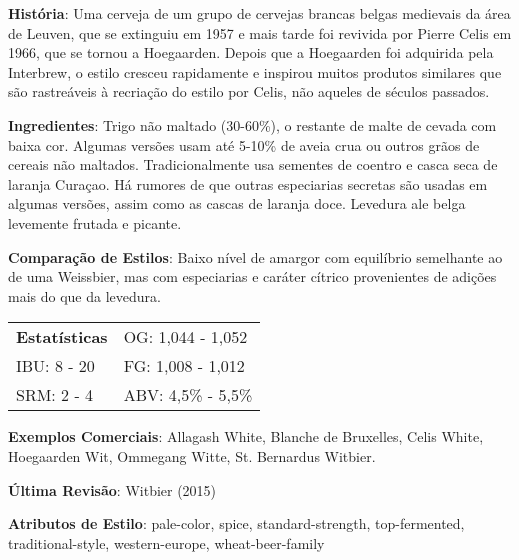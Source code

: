 \textbf{História}: Uma cerveja de um grupo de cervejas brancas belgas medievais da área de Leuven, que se extinguiu em 1957 e mais tarde foi revivida por Pierre Celis em 1966, que se tornou a Hoegaarden. Depois que a Hoegaarden foi adquirida pela Interbrew, o estilo cresceu rapidamente e inspirou muitos produtos similares que são rastreáveis à recriação do estilo por Celis, não aqueles de séculos passados.

\textbf{Ingredientes}: Trigo não maltado (30-60\%), o restante de malte de cevada com baixa cor. Algumas versões usam até 5-10\% de aveia crua ou outros grãos de cereais não maltados. Tradicionalmente usa sementes de coentro e casca seca de laranja Curaçao. Há rumores de que outras especiarias secretas são usadas em algumas versões, assim como as cascas de laranja doce. Levedura ale belga levemente frutada e picante.

\textbf{Comparação de Estilos}: Baixo nível de amargor com equilíbrio semelhante ao de uma Weissbier, mas com especiarias e caráter cítrico provenientes de adições mais do que da levedura.

\begin{tabular}{@{}p{35mm}p{35mm}@{}}
  \textbf{Estatísticas} & OG: 1,044 - 1,052 \\
  IBU: 8 - 20  & FG: 1,008 - 1,012  \\
  SRM: 2 - 4  & ABV: 4,5\% - 5,5\%
\end{tabular}

\textbf{Exemplos Comerciais}: Allagash White, Blanche de Bruxelles, Celis White, Hoegaarden Wit, Ommegang Witte, St. Bernardus Witbier.

\textbf{Última Revisão}: Witbier (2015)

\textbf{Atributos de Estilo}: pale-color, spice, standard-strength, top-fermented, traditional-style, western-europe, wheat-beer-family
